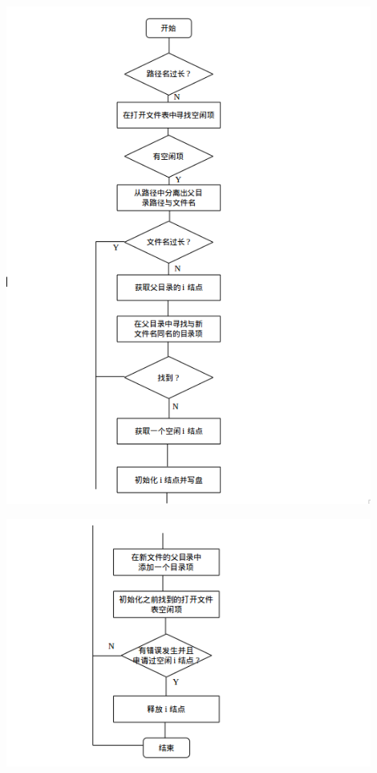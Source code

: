 \documentclass[nofonts]{ctexart}
\begin{document}
\begin{itemize}
  \includegraphics[width=12cm]{./images/./creat_1.png}

  \includegraphics[width=12cm]{./images/./creat_2.png}
  \end{itemize}
\end{document}
